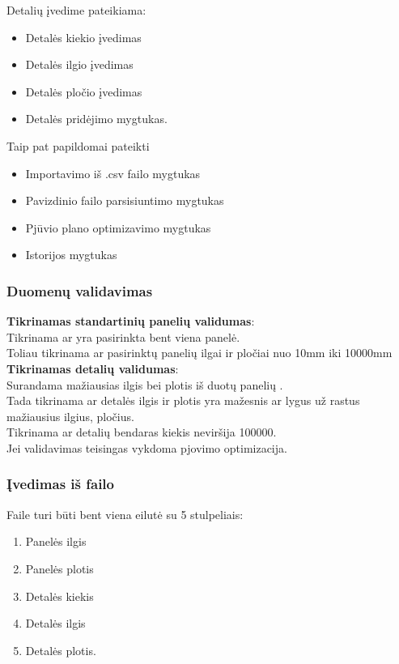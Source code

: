 \documentclass[a4paper,12pt]{article}
\begin{document}
Detalių įvedime pateikiama:
\begin{itemize}
	\item Detalės kiekio įvedimas
	\item Detalės ilgio įvedimas
	\item Detalės pločio įvedimas
	\item Detalės pridėjimo mygtukas.
\end{itemize}

Taip pat papildomai pateikti
\begin{itemize}
	\item Importavimo iš .csv failo mygtukas
	\item Pavizdinio failo parsisiuntimo mygtukas 
	\item Pjūvio plano optimizavimo mygtukas 
	\item Istorijos mygtukas
\end{itemize}

\subsubsection{Duomenų validavimas}
\textbf{Tikrinamas standartinių panelių validumas}:\\
	Tikrinama ar yra pasirinkta bent viena panelė. \\
	Toliau tikrinama ar pasirinktų panelių ilgai ir pločiai nuo 10mm iki 10000mm \\


\textbf{Tikrinamas detalių validumas}:\\
	Surandama mažiausias ilgis bei plotis iš duotų panelių .\\
	Tada tikrinama ar detalės ilgis ir plotis yra mažesnis ar lygus už rastus mažiausius ilgius, pločius.\\
	Tikrinama ar detalių bendaras kiekis neviršija 100000. \\

Jei validavimas teisingas vykdoma pjovimo optimizacija.

\subsubsection{Įvedimas iš failo}

Faile turi būti bent viena eilutė su 5 stulpeliais:
\begin{enumerate}
	\item Panelės ilgis
	\item Panelės plotis
	\item Detalės kiekis
	\item Detalės ilgis
	\item Detalės plotis.
\end{enumerate}
\end{document}

